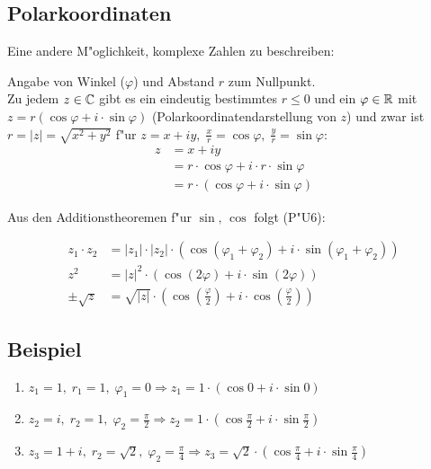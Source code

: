 
\subsection{Polarkoordinaten}

Eine andere M"oglichkeit, komplexe Zahlen zu beschreiben:

Angabe von Winkel ($\varphi$) und Abstand $r$ zum Nullpunkt.\\
Zu jedem $z \in \mathbb{C}$ gibt es ein eindeutig bestimmtes $r \leq 0$ und ein $\varphi \in \mathbb{R}$ mit \\$z=r(\cos\varphi+i \cdot \sin \varphi)$ (Polarkoordinatendarstellung von $z$) und zwar ist $r=|z|=\sqrt{x^2 + y^2}$ f"ur $z = x + iy, \;\frac{x}{r}= \cos\varphi, \; \frac{y}{r}=\sin \varphi$:
\begin{align*}
	z &= x +iy\\
	&= r \cdot \cos\varphi + i \cdot r \cdot \sin\varphi\\
	&= r \cdot (\cos\varphi + i \cdot\sin\varphi)
\end{align*}

Aus den Additionstheoremen f"ur $\sin, \, \cos$ folgt (P"U6):

\begin{align*}
z_1 \cdot z_2 &= |z_1| \cdot |z_2|\cdot (\cos(\varphi_1 + \varphi_2)+i \cdot \sin(\varphi_1 + \varphi_2))\\
z^2 &= |z|^2 \cdot (\cos(2\varphi)+ i \cdot \sin(2\varphi))\\
\pm \sqrt{z} &= \sqrt{|z|} \cdot (\cos (\frac{\varphi}{2}) + i \cdot \cos (\frac{\varphi}{2}))
\end{align*}

\subsection{Beispiel}
\begin{enumerate}
	\item
	$z_1=1,\; r_1=1, \; \varphi_1= 0 \Rightarrow z_1 = 1 \cdot (\cos 0+ i \cdot \sin 0 )$
	\item
	$z_2=i, \; r_2=1, \; \varphi_2=\frac{\pi}{2}\Rightarrow z_2 = 1 \cdot (\cos \frac{\pi}{2}+ i \cdot \sin \frac{\pi}{2} )$
	\item
	$z_3=1+i, \; r_2=\sqrt{2}, \; \varphi_2=\frac{\pi}{4}\Rightarrow z_3 = \sqrt{2} \cdot (\cos \frac{\pi}{4}+ i \cdot \sin \frac{\pi}{4} )$
\end{enumerate}

